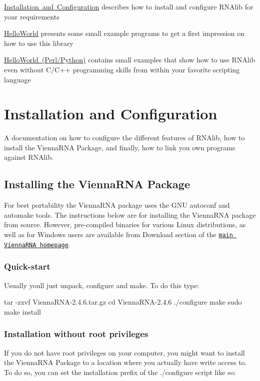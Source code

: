 
\begin{DoxyItemize}
\item \mbox{\hyperlink{install}{Installation and Configuration}} describes how to install and configure {\ttfamily R\+N\+Alib} for your requirements
\item \mbox{\hyperlink{helloworld}{Hello\+World}} presents some small example programs to get a first impression on how to use this library
\item \mbox{\hyperlink{helloworld_swig}{Hello\+World (Perl/\+Python)}} contains small examples that show how to use R\+N\+Alib even without C/\+C++ programming skills from within your favorite scripting language 
\end{DoxyItemize}\hypertarget{install}{}\section{Installation and Configuration}\label{install}
A documentation on how to configure the different features of {\ttfamily R\+N\+Alib}, how to install the Vienna\+R\+NA Package, and finally, how to link you own programs against {\ttfamily R\+N\+Alib}.\hypertarget{install_installation}{}\subsection{Installing the Vienna\+R\+N\+A Package}\label{install_installation}
For best portability the Vienna\+R\+NA package uses the G\+NU autoconf and automake tools. The instructions below are for installing the Vienna\+R\+NA package from source. However, pre-\/compiled binaries for various Linux distributions, as well as for Windows users are available from Download section of the \href{https://www.tbi.univie.ac.at/RNA}{\tt main Vienna\+R\+NA homepage}.\hypertarget{install_quickstart}{}\subsubsection{Quick-\/start}\label{install_quickstart}
Usually you\textquotesingle{}ll just unpack, configure and make. To do this type\+:

\begin{DoxyVerb}tar -zxvf ViennaRNA-2.4.6.tar.gz
cd ViennaRNA-2.4.6
./configure
make
sudo make install
\end{DoxyVerb}
\hypertarget{install_userdir_install}{}\subsubsection{Installation without root privileges}\label{install_userdir_install}
If you do not have root privileges on your computer, you might want to install the Vienna\+R\+NA Package to a location where you actually have write access to. To do so, you can set the installation prefix of the ./configure script like so\+:

